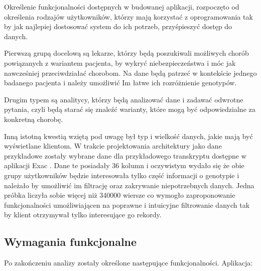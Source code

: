 \documentclass[a4paper,12pt,twoside]{article}
\begin{document}

Określenie funkcjonalności dostępnych w budowanej aplikacji, rozpoczęto od określenia 
rodzajów użytkowników, którzy mają korzystać z oprogramowania tak by jak najlepiej dostosować
system do ich potrzeb, przyśpieszyć dostęp do danych.

Pierwszą grupą docelową są lekarze, którzy będą poszukiwali
możliwych chorób powiązanych z wariantem pacjenta, by wykryć niebezpieczeństwa
i móc jak nawcześniej przeciwdziałać chorobom. 
Na dane będą patrzeć w kontekście jednego badanego pacjenta i należy umożliwić Im łatwe 
ich rozróżnienie genotypów. 

Drugim typem są analitycy, którzy będą analizować dane i zadawać 
odwrotne pytania, czyli będą starać się znaleźć warianty, które mogą być odpowiedzialne
za konkretną chorobę. 

Inną istotną kwestią wziętą pod uwagę był typ i wielkość danych, jakie mają być wyświetlane klientom.
W trakcie projektowania architektury jako dane przykładowe zostały wybrane dane dla przykładowego transkryptu dostępne w aplikacji Exac \cite{exac}. Dane te posiadały 36 kolumn i oczywistym wydało się że obie grupy użytkowników będzie interesowała tylko część informacji o genotypie i należało by umożliwić im filtrację oraz zakrywanie niepotrzebnych danych. 
Jedna próbka liczyła sobie więcej niż 340000 wiersze co wymogło zaproponowanie 
funkcjonalności umożliwiającen na poprawne i intuicyjne filtrowanie danych 
tak by klient otrzymywał tylko interesujące go rekordy.

\subsection{Wymagania funkcjonalne}
Po zakończeniu analizy zostały określone następujące funkcjonalności. Aplikacja:
\end{document}
